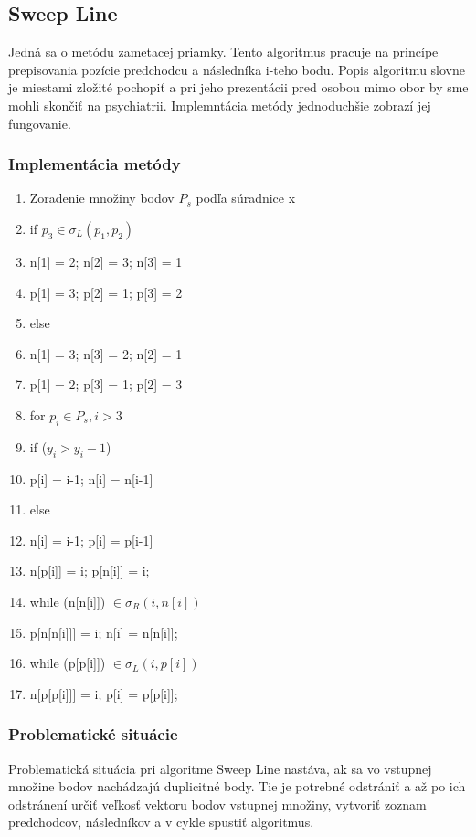 \documentclass[12pt]{article}
\begin{document}
\subsection {Sweep Line}
Jedná sa o metódu zametacej priamky. Tento algoritmus pracuje na princípe prepisovania pozície predchodcu a následníka i-teho bodu. Popis algoritmu slovne je miestami zložité pochopiť a pri jeho prezentácii pred osobou mimo obor by sme mohli skončiť na psychiatrii. Implemntácia metódy jednoduchšie zobrazí jej fungovanie.

\subsubsection{Implementácia metódy}
\begin{enumerate}
	\item  Zoradenie množiny bodov $P_s$ podľa súradnice x
	\item if $p_3 \in \sigma_L (p_1, p_2)$
	\item \hspace {1.5cm} n[1] = 2; n[2] = 3; n[3] = 1
	\item \hspace {1.5cm} p[1] = 3; p[2] = 1; p[3] = 2
	\item else
	\item \hspace {1.5cm} n[1] = 3; n[3] = 2; n[2] = 1
	\item \hspace {1.5cm} p[1] = 2; p[3] = 1; p[2] = 3
	\item for $p_i \in P_s, i > 3$
	\item \hspace {1.5cm} if ($y_i>y_i-1$) 
	\item \hspace {2.5cm} p[i] = i-1; n[i] = n[i-1]
	\item \hspace {1.5cm} else 
	\item \hspace {2.5cm} n[i] = i-1; p[i] = p[i-1]
	\item \hspace {1.5cm}n[p[i]] = i; p[n[i]] = i;
	\item \hspace {1.5cm}while (n[n[i]]) $\in \sigma_R (i, n[i]) $
	\item \hspace {2.5cm} p[n[n[i]]] = i; n[i] = n[n[i]];
	\item \hspace {1.5cm} while (p[p[i]]) $\in \sigma_L (i, p[i]) $
	\item \hspace {2.5cm} n[p[p[i]]] = i; p[i] = p[p[i]];
\end{enumerate}
\subsubsection{Problematické situácie}
Problematická situácia pri algoritme Sweep Line nastáva, ak sa vo vstupnej množine bodov nachádzajú duplicitné body. Tie je potrebné odstrániť a až po ich odstránení určiť veľkosť vektoru bodov vstupnej množiny, vytvoriť zoznam predchodcov,  následníkov a v cykle spustiť algoritmus.
\end{document}
